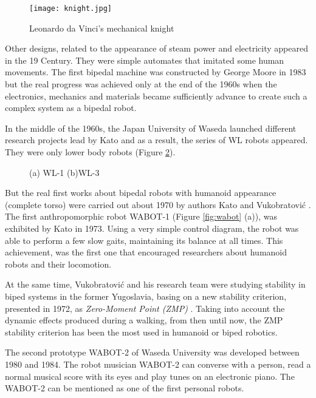 \begin{figure}[!hbt]
\centering
\texttt{[image: knight.jpg]}
\caption{Leonardo da Vinci's mechanical knight}
\label{fig:knight}
\end{figure}

Other designs, related to the appearance of steam power and electricity appeared in the 19 Century. They were simple automates that imitated some human movements. The first bipedal machine was constructed by George Moore in 1983 but the real progress was achieved only at the end of the 1960s when the electronics, mechanics and materials became sufficiently advance to create such a complex system as a bipedal robot.

In the middle of the 1960s, the Japan University of Waseda launched different research projects lead by Kato and as a result, the series of WL robots appeared. They were only lower body robots (Figure \ref{fig:wl}).

\begin{figure}[!hbt]
\centering 
{}\hspace{10mm}
\caption{(a) WL-1 (b)WL-3}
\label{fig:wl}
\end{figure}

But the real first works about bipedal robots with humanoid appearance (complete torso) were carried out about 1970 by authors Kato \cite{Kaj2005} and Vukobratović \cite{Vuk1970}. The first anthropomorphic robot WABOT-1 (Figure \ref{fig:wabot} (a)), was exhibited by Kato in 1973. Using a very simple control diagram, the robot was able to perform a few slow gaits, maintaining its balance at all times. This achievement, was the first one that encouraged researchers about humanoid robots and their locomotion.

At the same time, Vukobratović and his research team were studying stability in biped systems in the former Yugoslavia, basing on a new stability criterion, presented in 1972, as \textit{Zero-Moment Point (ZMP)} \cite{Vuk2004}. Taking into account the dynamic effects produced during a walking, from then until now, the ZMP stability criterion has been the most used in humanoid or biped robotics.

The second prototype WABOT-2 of Waseda University was developed between 1980 and 1984. The robot musician WABOT-2 can converse with a person, read a normal musical score with its eyes and play tunes on an electronic piano. The WABOT-2 can be mentioned as one of the first personal robots.

